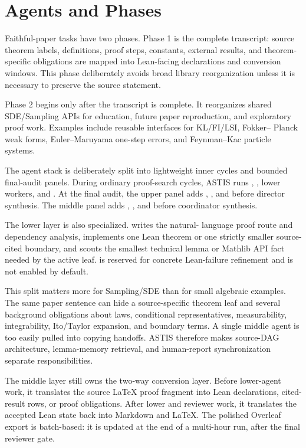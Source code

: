 \section{Agents and Phases}

Faithful-paper tasks have two phases.  Phase 1 is the complete transcript:
source theorem labels, definitions, proof steps, constants, external results,
and theorem-specific obligations are mapped into Lean-facing declarations and
conversion windows.  This phase deliberately avoids broad library
reorganization unless it is necessary to preserve the source statement.

Phase 2 begins only after the transcript is complete.  It reorganizes shared
SDE/Sampling APIs for education, future paper reproduction, and exploratory
proof work.  Examples include reusable interfaces for KL/FI/LSI, Fokker--
Planck weak forms, Euler--Maruyama one-step errors, and Feynman--Kac particle
systems.

The agent stack is deliberately split into lightweight inner cycles and
bounded final-audit panels.  During ordinary proof-search cycles, ASTIS runs
, , lower workers, and
.  At the final audit, the upper panel adds
, , and
 before director synthesis.  The middle panel adds
, , and
 before coordinator synthesis.

The lower layer is also specialized.   writes the natural-
language proof route and dependency analysis,  implements one
Lean theorem or one strictly smaller source-cited boundary, and
 scouts the smallest technical lemma or Mathlib API fact needed
by the active leaf.   is reserved for concrete Lean-failure
refinement and is not enabled by default.

This split matters more for Sampling/SDE than for small algebraic examples.
The same paper sentence can hide a source-specific theorem leaf and several
background obligations about laws, conditional representatives, measurability,
integrability, Ito/Taylor expansion, and boundary terms.  A single middle agent
is too easily pulled into copying handoffs.  ASTIS therefore makes source-DAG
architecture, lemma-memory retrieval, and human-report synchronization separate
responsibilities.

The middle layer still owns the two-way conversion layer.  Before lower-agent
work, it translates the source LaTeX proof fragment into Lean declarations,
cited-result rows, or proof obligations.  After lower and reviewer work, it
translates the accepted Lean state back into Markdown and LaTeX.  The polished
Overleaf export is batch-based: it is updated at the end of a multi-hour run,
after the final reviewer gate.



